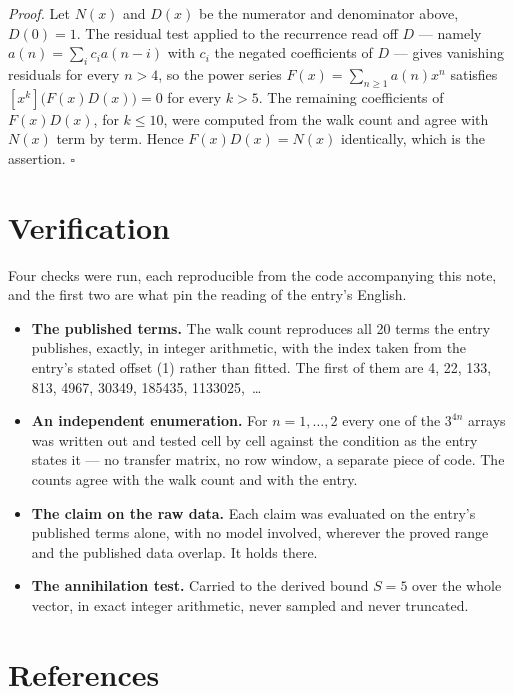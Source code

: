 \documentclass[11pt]{article}
\theoremstyle{definition}
\begin{document}
{\itshape Proof.} Let $N(x)$ and $D(x)$ be the numerator and denominator above, $D(0)=1$. The residual test applied to the recurrence read off $D$ --- namely $a(n) = \sum_i c_i a(n-i)$ with $c_i$ the negated coefficients of $D$ --- gives vanishing residuals for every $n > 4$, so the power series $F(x)=\sum_{n\ge 1}a(n)x^n$ satisfies $[x^k]\bigl(F(x)D(x)\bigr) = 0$ for every $k > 5$. The remaining coefficients of $F(x)D(x)$, for $k \le 10$, were computed from the walk count and agree with $N(x)$ term by term. Hence $F(x)D(x) = N(x)$ identically, which is the assertion. $\square$

\section{Verification}

Four checks were run, each reproducible from the code accompanying this note, and the first two are what pin the reading of the entry's English.

\begin{itemize}

\item {\bfseries The published terms.} The walk count reproduces all 20 terms the entry publishes, exactly, in integer arithmetic, with the index taken from the entry's stated offset (1) rather than fitted. The first of them are 4, 22, 133, 813, 4967, 30349, 185435, 1133025,~\dots

\item {\bfseries An independent enumeration.} For $n = 1,\dots,2$ every one of the $3^{4n}$ arrays was written out and tested cell by cell against the condition as the entry states it --- no transfer matrix, no row window, a separate piece of code. The counts agree with the walk count and with the entry.

\item {\bfseries The claim on the raw data.} Each claim was evaluated on the entry's published terms alone, with no model involved, wherever the proved range and the published data overlap. It holds there.

\item {\bfseries The annihilation test.} Carried to the derived bound $S = 5$ over the whole vector, in exact integer arithmetic, never sampled and never truncated.

\end{itemize}

\section{References}
\end{document}

